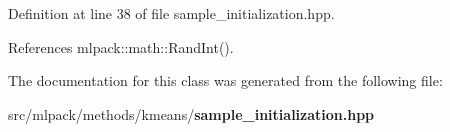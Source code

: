 Definition at line 38 of file sample\+\_\+initialization.\+hpp.



References mlpack\+::math\+::\+Rand\+Int().



The documentation for this class was generated from the following file\+:\begin{DoxyCompactItemize}
\item 
src/mlpack/methods/kmeans/{\bf sample\+\_\+initialization.\+hpp}\end{DoxyCompactItemize}
